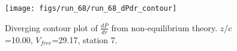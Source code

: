 \begin{figure}[H]
\centering
\texttt{[image: figs/run\_68/run\_68\_dPdr\_contour]}
\caption{Diverging contour plot of $\frac{d\bar{P}}{dr}$ from non-equilibrium theory. $z/c$=10.00, $V_{free}$=29.17, station 7.}
\label{fig:run_68_dPdr_contour}
\end{figure}


